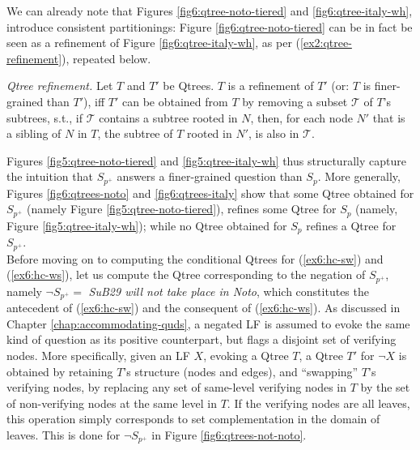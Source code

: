 We can already note that Figures \ref{fig6:qtree-noto-tiered} and \ref{fig6:qtree-italy-wh}, introduce consistent partitionings: Figure \ref{fig6:qtree-noto-tiered} can be in fact be seen as a refinement of Figure \ref{fig6:qtree-italy-wh}, as per (\ref{ex2:qtree-refinement}), repeated below.

\begin{exe}
	 {\textit{Qtree refinement.} Let $T$ and $T'$ be Qtrees. $T$ is a refinement of $T'$ (or: $T$ is finer-grained than $T'$), iff $T'$ can be obtained from $T$ by removing a subset $\mathcal{T}$ of $T$'s subtrees, s.t., if $\mathcal{T}$ contains a subtree rooted in $N$, then, for each node $N'$ that is a sibling of $N$ in $T$, the subtree of $T$ rooted in $N'$, is also in $\mathcal{T}$.}
\end{exe}

Figures \ref{fig5:qtree-noto-tiered} and \ref{fig5:qtree-italy-wh} thus structurally capture the intuition that $S_{p^+}$ answers a finer-grained question than $S_p$. More generally, Figures \ref{fig6:qtrees-noto} and \ref{fig6:qtrees-italy} show that some Qtree obtained for $S_{p^+}$ (namely Figure \ref{fig5:qtree-noto-tiered}), refines some Qtree for $S_p$ (namely, Figure \ref{fig5:qtree-italy-wh}); while no Qtree obtained for $S_p$ refines a Qtree for $S_{p^+}$.\\

Before moving on to computing the conditional Qtrees for (\ref{ex6:hc-sw}) and (\ref{ex6:hc-ws}), let us compute the Qtree corresponding to the negation of $S_{p^+}$, namely $\neg S_{p^+} = $ \textit{SuB29 will not take place in Noto}, which constitutes the antecedent of (\ref{ex6:hc-sw}) and the consequent of (\ref{ex6:hc-ws}). As discussed in Chapter \ref{chap:accommodating-quds}, a negated LF is assumed to evoke the same kind of question as its positive counterpart, but flags a disjoint set of verifying nodes. More specifically, given an LF $X$, evoking a Qtree $T$, a Qtree $T'$ for $\neg X$ is obtained by retaining $T$'s structure (nodes and edges), and ``swapping'' $T$'s verifying nodes, by replacing any set of same-level verifying nodes in $T$ by the set of non-verifying nodes at the same level in $T$. If the verifying nodes are all leaves, this operation simply corresponds to set complementation in the domain of leaves. This is done for $\neg S_{p^+}$ in Figure \ref{fig6:qtrees-not-noto}.

